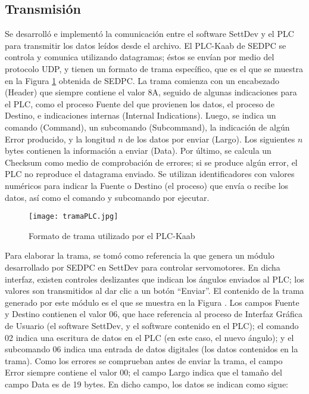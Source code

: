 \subsection{Transmisión}

Se desarrolló e implementó la comunicación entre el software SettDev y el PLC para transmitir los datos leídos desde el archivo. El PLC-Kaab de SEDPC se controla y comunica utilizando datagramas; éstos se envían por medio del protocolo UDP, y tienen un formato de trama específico, que es el que se muestra en la Figura \ref{fig:tramaPLC} obtenida de SEDPC. La trama comienza con un encabezado (Header) que siempre contiene el valor 8A, seguido de algunas indicaciones para el PLC, como el proceso Fuente del que provienen los datos, el proceso de Destino, e indicaciones internas (Internal Indications). Luego, se indica un comando (Command), un subcomando (Subcommand), la indicación de algún Error producido, y la longitud $n$ de los datos por enviar (Largo). Los siguientes $n$ bytes contienen la información a enviar (Data). Por último, se calcula un Checksum como medio de comprobación de errores; si se produce algún error, el PLC no reproduce el datagrama enviado. Se utilizan identificadores con valores numéricos para indicar la Fuente o Destino (el proceso) que envía o recibe los datos, así como el comando y subcomando por ejecutar.

\begin{figure}[htb]
	\centering
	\texttt{[image: tramaPLC.jpg]}
	\caption{Formato de trama utilizado por el PLC-Kaab}
	\label{fig:tramaPLC}
\end{figure}

Para elaborar la trama, se tomó como referencia la que genera un módulo desarrollado por SEDPC en SettDev para controlar servomotores. En dicha interfaz, existen controles deslizantes que indican los ángulos enviados al PLC; los valores son transmitidos al dar clic a un botón ``Enviar''. El contenido de la trama generado por este módulo es el que se muestra en la Figura . Los campos Fuente y Destino contienen el valor 06, que hace referencia al proceso de Interfaz Gráfica de Usuario (el software SettDev, y el software contenido en el PLC); el comando 02 indica una escritura de datos en el PLC (en este caso, el nuevo ángulo); y el subcomando 06 indica una entrada de datos digitales (los datos contenidos en la trama). Como los errores se comprueban antes de enviar la trama, el campo Error siempre contiene el valor 00; el campo Largo indica que el tamaño del campo Data es de 19 bytes. En dicho campo, los datos se indican como sigue:

